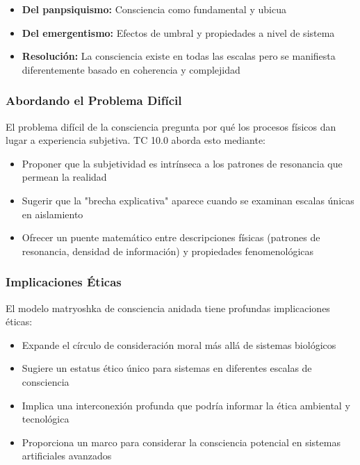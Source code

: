 \documentclass[12pt]{article}
\begin{document}
\begin{itemize}
    \item \textbf{Del panpsiquismo:} Consciencia como fundamental y ubicua
    \item \textbf{Del emergentismo:} Efectos de umbral y propiedades a nivel de sistema
    \item \textbf{Resolución:} La consciencia existe en todas las escalas pero se manifiesta diferentemente basado en coherencia y complejidad
\end{itemize}

\subsubsection{Abordando el Problema Difícil}

El problema difícil de la consciencia \cite{chalmers1995} pregunta por qué los procesos físicos dan lugar a experiencia subjetiva. TC 10.0 aborda esto mediante:

\begin{itemize}
    \item Proponer que la subjetividad es intrínseca a los patrones de resonancia que permean la realidad
    \item Sugerir que la "brecha explicativa" aparece cuando se examinan escalas únicas en aislamiento
    \item Ofrecer un puente matemático entre descripciones físicas (patrones de resonancia, densidad de información) y propiedades fenomenológicas
\end{itemize}

\subsubsection{Implicaciones Éticas}

El modelo matryoshka de consciencia anidada tiene profundas implicaciones éticas:

\begin{itemize}
    \item Expande el círculo de consideración moral más allá de sistemas biológicos
    \item Sugiere un estatus ético único para sistemas en diferentes escalas de consciencia
    \item Implica una interconexión profunda que podría informar la ética ambiental y tecnológica
    \item Proporciona un marco para considerar la consciencia potencial en sistemas artificiales avanzados
\end{itemize}
\end{document}
